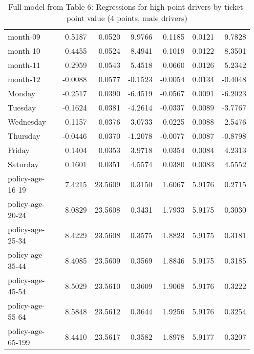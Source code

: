 \documentclass[10pt]{article}
\begin{document}
\begin{table}[ht]
\begin{tabular}{lrrrrrr}
  month-09 & 0.5187 & 0.0520 & 9.9766 & 0.1185 & 0.0121 & 9.7828 \\ 
  month-10 & 0.4455 & 0.0524 & 8.4941 & 0.1019 & 0.0122 & 8.3501 \\ 
  month-11 & 0.2959 & 0.0543 & 5.4518 & 0.0660 & 0.0126 & 5.2342 \\ 
  month-12 & -0.0088 & 0.0577 & -0.1523 & -0.0054 & 0.0134 & -0.4048 \\ 
  Monday & -0.2517 & 0.0390 & -6.4519 & -0.0567 & 0.0091 & -6.2023 \\ 
  Tuesday & -0.1624 & 0.0381 & -4.2614 & -0.0337 & 0.0089 & -3.7767 \\ 
  Wednesday & -0.1157 & 0.0376 & -3.0733 & -0.0225 & 0.0088 & -2.5476 \\ 
  Thursday & -0.0446 & 0.0370 & -1.2078 & -0.0077 & 0.0087 & -0.8798 \\ 
  Friday & 0.1404 & 0.0353 & 3.9718 & 0.0354 & 0.0084 & 4.2313 \\ 
  Saturday & 0.1601 & 0.0351 & 4.5574 & 0.0380 & 0.0083 & 4.5552 \\ 
  policy-age-16-19 & 7.4215 & 23.5609 & 0.3150 & 1.6067 & 5.9176 & 0.2715 \\ 
  policy-age-20-24 & 8.0829 & 23.5608 & 0.3431 & 1.7933 & 5.9175 & 0.3030 \\ 
  policy-age-25-34 & 8.4229 & 23.5608 & 0.3575 & 1.8823 & 5.9175 & 0.3181 \\ 
  policy-age-35-44 & 8.4085 & 23.5609 & 0.3569 & 1.8846 & 5.9175 & 0.3185 \\ 
  policy-age-45-54 & 8.5029 & 23.5610 & 0.3609 & 1.9068 & 5.9176 & 0.3222 \\ 
  policy-age-55-64 & 8.5848 & 23.5612 & 0.3644 & 1.9256 & 5.9176 & 0.3254 \\ 
  policy-age-65-199 & 8.4410 & 23.5617 & 0.3582 & 1.8978 & 5.9177 & 0.3207 \\ 
   \hline
\end{tabular}
\caption{Full model from Table 6: Regressions for high-point drivers by ticket-point value (4 points, male drivers)} 
\label{tab_6_4_pts_M}
\end{table}


\clearpage
\pagebreak



\end{document}
